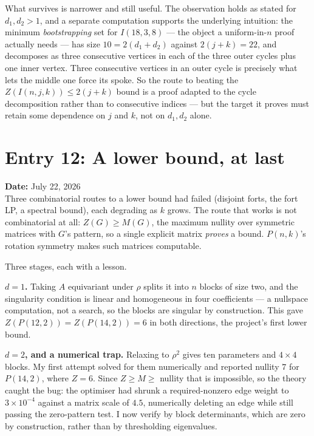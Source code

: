 \documentclass[12pt]{article}
\begin{document}
What survives is narrower and still useful. The observation holds as stated for
$d_1,d_2>1$, and a separate computation supports the underlying intuition: the
minimum \emph{bootstrapping} set for $I(18,3,8)$ --- the object a
uniform-in-$n$ proof actually needs --- has size $10=2(d_1+d_2)$ against
$2(j+k)=22$, and decomposes as three consecutive vertices in each of the three
outer cycles plus one inner vertex. Three consecutive vertices in an outer
cycle is precisely what lets the middle one force its spoke. So the route to
beating the $Z(I(n,j,k))\le 2(j+k)$ bound is a proof adapted to the cycle
decomposition
rather than to consecutive indices --- but the target it proves must retain
some dependence on $j$ and $k$, not on $d_1,d_2$ alone.



\clearpage
\section*{Entry 12: A lower bound, at last}
\textbf{Date:} July 22, 2026\\
Three combinatorial routes to a lower bound had failed (disjoint forts, the
fort LP, a spectral bound), each degrading as $k$ grows. The route that works
is not combinatorial at all: $Z(G)\ge M(G)$, the maximum nullity over symmetric
matrices with $G$'s pattern, so a single explicit matrix \emph{proves} a bound.
$P(n,k)$'s rotation symmetry makes such matrices computable.

Three stages, each with a lesson.

\textbf{$d=1$.} Taking $A$ equivariant under $\rho$ splits it into $n$ blocks of
size two, and the singularity condition is linear and homogeneous in four
coefficients --- a nullspace computation, not a search, so the blocks are
singular by construction. This gave $Z(P(12,2))=Z(P(14,2))=6$ in both
directions, the project's first lower bound.

\textbf{$d=2$, and a numerical trap.} Relaxing to $\rho^{2}$ gives ten
parameters and $4\times4$ blocks. My first attempt solved for them numerically
and reported nullity $7$ for $P(14,2)$, where $Z=6$. Since $Z\ge M\ge$ nullity
that is impossible, so the theory caught the bug: the optimiser had shrunk a
required-nonzero edge weight to $3\times10^{-4}$ against a matrix scale of
$4.5$, numerically deleting an edge while still passing the zero-pattern test.
I now verify by block determinants, which are zero by construction, rather than
by thresholding eigenvalues.
\end{document}
